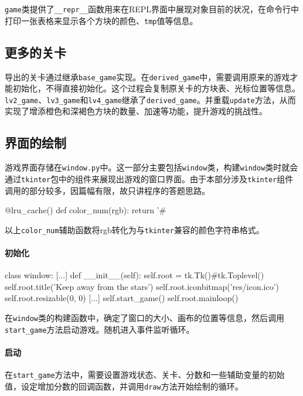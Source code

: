 \documentclass[UTF8]{article}
\begin{document}
\texttt{game}类提供了\verb|__repr__|函数用来在REPL界面中展现对象目前的状况，在命令行中打印一张表格来显示各个方块的颜色、\texttt{tmp}值等信息。

\subsection{更多的关卡}

导出的关卡通过继承\verb|base_game|实现。在\verb|derived_game|中，需要调用原来的游戏才能初始化，不得直接初始化。这个过程会复制原关卡的方块表、光标位置等信息。\verb|lv2_game|、\verb|lv3_game|和\verb|lv4_game|继承了\verb|derived_game|。并重载\texttt{update}方法，从而实现了增添橙色和深褐色方块的数量、加速等功能，提升游戏的挑战性。

\subsection{界面的绘制}

游戏界面存储在\texttt{window.py}中。这一部分主要包括\texttt{window}类，构建\texttt{window}类时就会通过\texttt{tkinter}包中的组件来展现出游戏的窗口界面。由于本部分涉及\texttt{tkinter}组件调用的部分较多，因篇幅有限，故只讲程序的答题思路。

\begin{python}
@lru_cache()
def color_num(rgb):
    return '#%
\end{python}
以上\verb|color_num|辅助函数将rgb转化为与\texttt{tkinter}兼容的颜色字符串格式。

\paragraph{初始化}
\begin{python}
class window:
    [...]
    def __init__(self):
        self.root = tk.Tk()#tk.Toplevel()
        self.root.title('Keep away from the stars')
        self.root.iconbitmap('res/icon.ico')
        self.root.resizable(0, 0)
        [...]
        self.start_game()
        self.root.mainloop()
\end{python}
在\texttt{window}类的构建函数中，确定了窗口的大小、画布的位置等信息，然后调用\verb|start_game|方法启动游戏。随机进入事件监听循环。

\paragraph{启动}
在\verb|start_game|方法中，需要设置游戏状态、关卡、分数和一些辅助变量的初始值，设定增加分数的回调函数，并调用\texttt{draw}方法开始绘制的循环。
\end{document}

